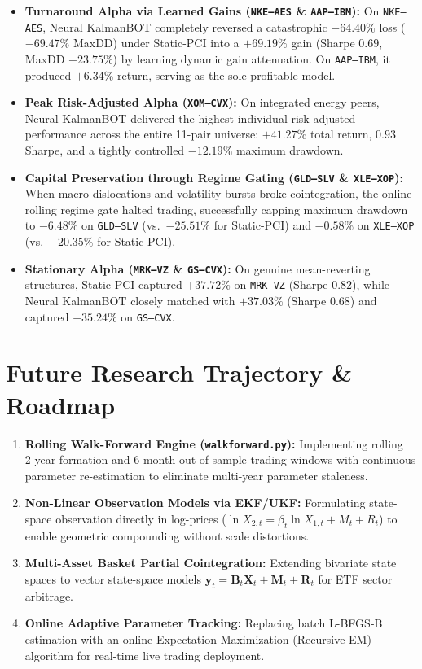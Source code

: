 \documentclass[11pt, a4paper]{article}
\begin{document}
\begin{itemize}
    \item \textbf{Turnaround Alpha via Learned Gains (\texttt{NKE--AES} \& \texttt{AAP--IBM}):} On \texttt{NKE--AES}, Neural KalmanBOT completely reversed a catastrophic $-64.40\%$ loss ($-69.47\%$ MaxDD) under Static-PCI into a $\mathbf{+69.19\%}$ gain (Sharpe $0.69$, MaxDD $-23.75\%$) by learning dynamic gain attenuation. On \texttt{AAP--IBM}, it produced $+6.34\%$ return, serving as the sole profitable model.
    \item \textbf{Peak Risk-Adjusted Alpha (\texttt{XOM--CVX}):} On integrated energy peers, Neural KalmanBOT delivered the highest individual risk-adjusted performance across the entire 11-pair universe: $\mathbf{+41.27\%}$ total return, $\mathbf{0.93}$ Sharpe, and a tightly controlled $-12.19\%$ maximum drawdown.
    \item \textbf{Capital Preservation through Regime Gating (\texttt{GLD--SLV} \& \texttt{XLE--XOP}):} When macro dislocations and volatility bursts broke cointegration, the online rolling regime gate halted trading, successfully capping maximum drawdown to $\mathbf{-6.48\%}$ on \texttt{GLD--SLV} (vs.\ $-25.51\%$ for Static-PCI) and $\mathbf{-0.58\%}$ on \texttt{XLE--XOP} (vs.\ $-20.35\%$ for Static-PCI).
    \item \textbf{Stationary Alpha (\texttt{MRK--VZ} \& \texttt{GS--CVX}):} On genuine mean-reverting structures, Static-PCI captured $+37.72\%$ on \texttt{MRK--VZ} (Sharpe $0.82$), while Neural KalmanBOT closely matched with $+37.03\%$ (Sharpe $0.68$) and captured $+35.24\%$ on \texttt{GS--CVX}.
\end{itemize}

\section{Future Research Trajectory \& Roadmap}

\begin{enumerate}
    \item \textbf{Rolling Walk-Forward Engine (\texttt{walkforward.py}):} Implementing rolling 2-year formation and 6-month out-of-sample trading windows with continuous parameter re-estimation to eliminate multi-year parameter staleness.
    \item \textbf{Non-Linear Observation Models via EKF/UKF:} Formulating state-space observation directly in log-prices ($\ln X_{2,t} = \beta_t \ln X_{1,t} + M_t + R_t$) to enable geometric compounding without scale distortions.
    \item \textbf{Multi-Asset Basket Partial Cointegration:} Extending bivariate state spaces to vector state-space models $\mathbf{y}_t = \mathbf{B}_t \mathbf{X}_t + \mathbf{M}_t + \mathbf{R}_t$ for ETF sector arbitrage.
    \item \textbf{Online Adaptive Parameter Tracking:} Replacing batch L-BFGS-B estimation with an online Expectation-Maximization (Recursive EM) algorithm for real-time live trading deployment.
\end{enumerate}
\end{document}
